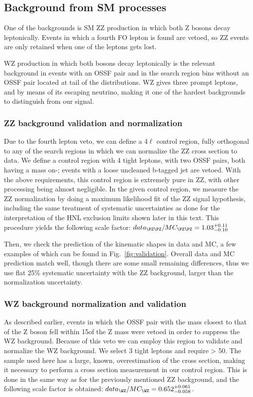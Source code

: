 \subsection{Background from SM processes}
One of the backgrounds is SM ZZ production in which both Z bosons
decay leptonically. Events in which a fourth FO lepton is found are vetoed, so ZZ events are only retained when one
of the leptons gets lost.

WZ production in which both bosons decay leptonically is the relevant background in events with an OSSF pair 
and in the search region bins without an OSSF pair located at tail of the distributions.
WZ gives three
prompt leptons, and \met  by means of its escaping neutrino, making it
one of the hardest backgrounds to distinguish from our signal.
\subsubsection{ZZ background validation and normalization}
Due to the fourth lepton veto, we can define a 4$\ell$ control region,
fully orthogonal to any of the search regions in which we can
normalize the ZZ cross section to data. We define a control region
with 4 tight leptons, with two OSSF pairs, both having a mass on-\PZ;
events with a loose uncleaned b-tagged jet are vetoed. With the above requirements, this control region is extremely pure in ZZ, with other processing being almost negligible.
In the given control region, we measure the ZZ normalization by doing a maximum likelihood fit of the ZZ signal hypothesis, including the same treatment of systematic uncertainties as done for the interpretation of the HNL exclusion limits shown later in this text. This procedure yields the following scale factor:
$data_{\PZ\PZ}/MC_{\PZ\PZ} = 1.03_{-0.10}^{+0.11}$

Then, we check the prediction of the kinematic shapes in data and MC,
a few examples of which can be found in
Fig.~\ref{fig:validation}. Overall data and MC prediction match well,
though there are some small remaining differences, thus we use flat 25\% systematic uncertainty with the ZZ background, larger than the normalization uncertainty.

\subsubsection{WZ background normalization and validation}
As described earlier, events in which the OSSF pair with the mass
closest to that of the Z boson fell within 15\GeV of the Z mass were
vetoed in order to suppress the WZ background. Because of this veto we
can employ this region to validate and normalize the WZ background. We
select 3 tight leptons and require \ptmiss> 50\GeV.
The sample used here has a large, known, overestimation of
the cross section, making it necessary to perform a cross section
measurement in our control region. This is done in the same way as for
the previously mentioned ZZ background, and the following scale factor
is obtained: $data_{\WZ}/MC_{\WZ}= 0.652_{-0.058}^{+0.061}$.

